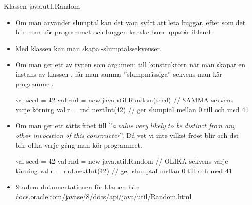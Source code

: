 

\ifkompendium\else


\begin{Slide}{Klassen java.util.Random}\SlideFontTiny
\begin{itemize}
\item Om man använder slumptal kan det vara svårt att leta buggar, efter som det blir  man kör programmet och buggen kanske bara uppstår ibland.

\item Med klassen  kan man skapa -slumptalssekvenser.
\pause
\item Om man ger ett   av typen  som argument till konstruktorn när man skapar en instans av klassen , får man samma ''slumpmässiga'' sekvens  man kör programmet.

\begin{Code}
  val seed = 42
  val rnd = new java.util.Random(seed)  // SAMMA sekvens varje körning
  val r = rnd.nextInt(42) // ger slumptal mellan 0 till och med 41
\end{Code}
\pause
\item Om man  ger ett  sätts fröet till ''\emph{a value very likely to be distinct from any other invocation of this constructor}''. Då vet vi inte vilket fröet blir och det blir olika varje gång man kör programmet.
\begin{Code}
  val seed = 42
  val rnd = new java.util.Random  // OLIKA sekvens varje körning
  val r = rnd.nextInt(42) // ger slumptal mellan 0 till och med 41
\end{Code}
\pause
\item Studera dokumentationen för klassen  här: \href{https://docs.oracle.com/javase/8/docs/api/java/util/Random.html}{\SlideFontSmall docs.oracle.com/javase/8/docs/api/java/util/Random.html}

\end{itemize}
\end{Slide}

